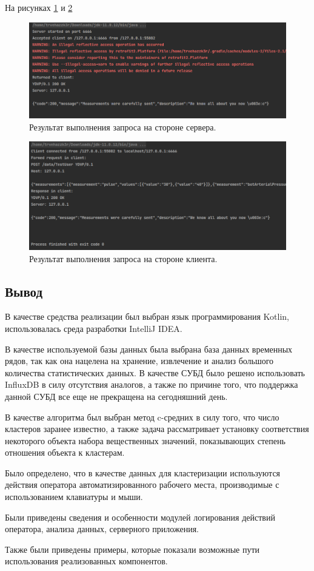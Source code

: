На рисунках \ref{fig:serverExample} и \ref{fig:clientExample}

\begin{figure}[H]
	\centering
	\includegraphics[width=\textwidth]{img/serverOutput.png}
	\caption{Результат выполнения запроса на стороне сервера.}
	\label{fig:serverExample}
\end{figure}

\begin{figure}[H]
	\centering
	\includegraphics[width=\textwidth]{img/clientOutput.png}
	\caption{Результат выполнения запроса на стороне клиента.}
	\label{fig:clientExample}
\end{figure}

\subsection*{Вывод}
В качестве средства реализации был выбран язык программирования \newline Kotlin, использовалась среда разработки IntelliJ IDEA.

В качестве используемой базы данных была выбрана база данных временных рядов, так как она нацелена на хранение, извлечение и анализ большого количества статистических данных. В качестве СУБД было решено использовать InfluxDB в силу отсутствия аналогов, а также по причине того, что поддержка данной СУБД все еще не прекращена на сегодняшний день.

В качестве алгоритма был выбран метод c-средних в силу того, что число кластеров заранее известно, а также задача рассматривает установку соответствия некоторого объекта набора вещественных значений, показывающих степень отношения объекта к кластерам.

Было определено, что в качестве данных для кластеризации используются действия оператора автоматизированного рабочего места, производимые с использованием клавиатуры и мыши.

Были приведены сведения и особенности модулей логирования действий оператора, анализа данных, серверного приложения.

Также были приведены примеры, которые показали возможные пути использования реализованных компонентов.
